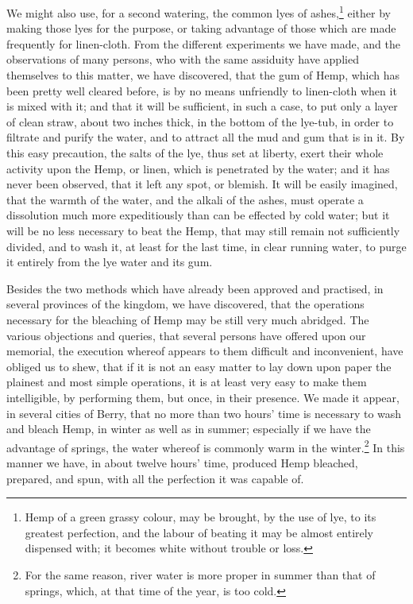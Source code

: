 \documentclass[a4paper, 11pt, oneside, polutonikogreek, english]{article}
\begin{document}
We might also use, for a second watering, the common lyes of ashes,\footnote{Hemp of a green grassy colour, may be brought, by the use of lye, to its greatest perfection, and the labour of beating it may be almost entirely dispensed with; it becomes white without trouble or loss.} either by making those lyes for the purpose, or taking advantage of those which are made frequently for linen-cloth. From the different experiments we have made, and the observations of many persons, who with the same assiduity have applied themselves to this matter, we have discovered, that the gum of Hemp, which has been pretty well cleared before, is by no means unfriendly to linen-cloth when it is mixed with it; and that it will be sufficient, in such a case, to put only a layer of clean straw, about two inches thick, in the bottom of the lye-tub, in order to filtrate and purify the water, and to attract all the mud and gum that is in it. By this easy precaution, the salts of the lye, thus set at liberty, exert their whole activity upon the Hemp, or linen, which is penetrated by the water; and it has never been observed, that it left any spot, or blemish. It will be easily imagined, that the warmth of the water, and the alkali of the ashes, must operate a dissolution much more expeditiously than can be effected by cold water; but it will be no less necessary to beat the Hemp, that may still remain not sufficiently divided, and to wash it, at least for the last time, in clear running water, to purge it entirely from the lye water and its gum.

Besides the two methods which have already been approved and practised, in several provinces of the kingdom, we have discovered, that the operations necessary for the bleaching of Hemp may be still very much abridged. The various objections and queries, that several persons have offered upon our memorial, the execution whereof appears to them difficult and inconvenient, have obliged us to shew, that if it is not an easy matter to lay down upon paper the plainest and most simple operations, it is at least very easy to make them intelligible, by performing them, but once, in their presence. We made it appear, in several cities of Berry, that no more than two hours’ time is necessary to wash and bleach Hemp, in winter as well as in summer; especially if we have the advantage of springs, the water whereof is commonly warm in the winter.\footnote{For the same reason, river water is more proper in summer than that of springs, which, at that time of the year, is too cold.} In this manner we have, in about twelve hours’ time, produced Hemp bleached, prepared, and spun, with all the perfection it was capable of.
\end{document}
